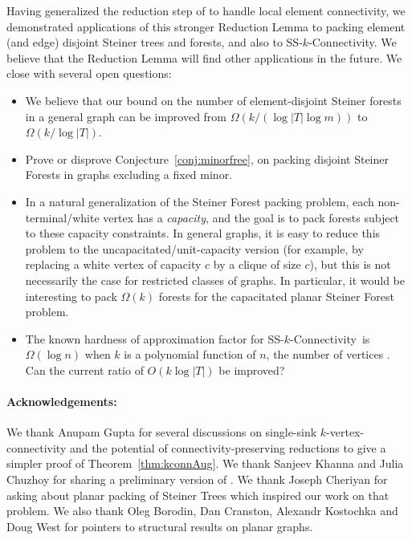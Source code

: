 \documentclass[11pt]{article}
\newcommand{\sskconn}{{\sc SS-$k$-Connectivity}}
\begin{document}
Having generalized the reduction step of \cite{hind} to handle local
element connectivity, we demonstrated applications of this stronger
Reduction Lemma to packing element (and edge) disjoint Steiner trees
and forests, and also to \sskconn. We believe that the Reduction Lemma
will find other applications in the future. We close with several open
questions:
\begin{itemize}
\item We believe that our bound on the number of element-disjoint
Steiner forests in a general graph can be improved from
$\Omega(k/(\log |T| \log m))$ to $\Omega(k/\log |T|)$.

\item Prove or disprove Conjecture~\ref{conj:minorfree}, on packing
  disjoint Steiner Forests in graphs excluding a fixed minor.

\item In a natural generalization of the Steiner Forest packing
  problem, each non-terminal/white vertex has a \emph{capacity}, and
  the goal is to pack forests subject to these capacity constraints.
  In general graphs, it is easy to reduce this problem to the
  uncapacitated/unit-capacity version (for example, by replacing a
  white vertex of capacity $c$ by a clique of size $c$), but this is
  not necessarily the case for restricted classes of graphs. In
  particular, it would be interesting to pack $\Omega(k)$ forests for
  the capacitated planar Steiner Forest problem.

\item The known hardness of approximation factor for \sskconn~is
  $\Omega(\log n)$ when $k$ is a polynomial function of $n$, the number
  of vertices \cite{KortsarzKL}. Can the current ratio of $O(k \log
  |T|)$ be improved? 
\end{itemize}

\paragraph{Acknowledgements:} We thank Anupam Gupta for several
discussions on single-sink $k$-vertex-connectivity and the potential
of connectivity-preserving reductions to give a simpler proof of
Theorem~\ref{thm:kconnAug}. We thank Sanjeev Khanna and Julia Chuzhoy
for sharing a preliminary version of \cite{ChuzhoyK08}.  We thank
Joseph Cheriyan for asking about planar packing of Steiner Trees which
inspired our work on that problem. We also thank Oleg Borodin, Dan
Cranston, Alexandr Kostochka and Doug West for pointers to structural
results on planar graphs.
\end{document}
